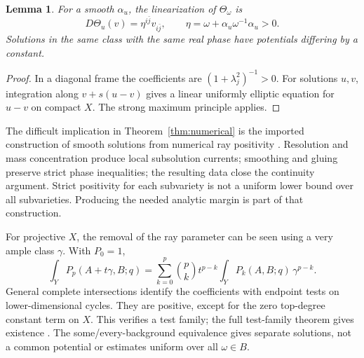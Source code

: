 \documentclass[12pt,reqno]{amsart}
\numberwithin{equation}{section}
\theoremstyle{plain}
\newtheorem{lemma}[theorem]{Lemma}
\theoremstyle{definition}
\theoremstyle{remark}
\begin{document}
\begin{lemma}\label{lem:unique}
For a smooth $\alpha_u$, the linearization of $\Theta_\omega$ is
\[
 D\Theta_u(v)=\eta^{i\bar j}v_{i\bar j},\qquad
 \eta=\omega+\alpha_u\omega^{-1}\alpha_u>0.
\]
Solutions in the same class with the same real phase have potentials differing by a constant.
\end{lemma}
\begin{proof}\label{proof:unique}
In a diagonal frame the coefficients are $(1+\lambda_j^2)^{-1}>0$.
For solutions $u,v$, integration along $v+s(u-v)$ gives a linear uniformly elliptic equation for $u-v$ on compact $X$. The strong maximum principle applies.
\end{proof}

The difficult implication in Theorem~\ref{thm:numerical} is the imported construction of smooth solutions from numerical ray positivity \cite[Sections 3--7]{CLT}.
Resolution and mass concentration produce local subsolution currents; smoothing and gluing preserve strict phase inequalities; the resulting data close the continuity argument.
Strict positivity for each subvariety is not a uniform lower bound over all subvarieties. Producing the needed analytic margin is part of that construction.

For projective $X$, the removal of the ray parameter can be seen using a very ample class $\gamma$. With $P_0=1$,
\[
 \int_Y P_p(A+t\gamma,B;q)
 =\sum_{k=0}^p\binom pk t^{p-k}
       \int_Y P_k(A,B;q)\,\gamma^{p-k}.
\]
General complete intersections identify the coefficients with endpoint tests on lower-dimensional cycles. They are positive, except for the zero top-degree constant term on $X$. This verifies a test family; the full test-family theorem gives existence \cite[Section 2, Corollary 1.5]{CLT}.
The some/every-background equivalence gives separate solutions, not a common potential or estimates uniform over all $\omega\in B$.
\end{document}
